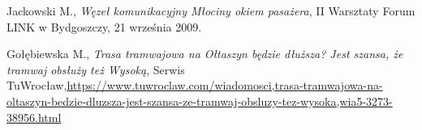 \begin{thebibliography}{99}
	Jackowski M., \emph{Węzeł komunikacyjny Młociny okiem pasażera}, II Warsztaty Forum LINK w Bydgoszczy, 21 września 2009.
	
	
	
	Gołębiewska M., \emph{Trasa tramwajowa na Ołtaszyn będzie dłuższa? Jest szansa, że tramwaj obsłuży też Wysoką}, Serwis TuWrocław,\url{https://www.tuwroclaw.com/wiadomosci,trasa-tramwajowa-na-oltaszyn-bedzie-dluzsza-jest-szansa-ze-tramwaj-obsluzy-tez-wysoka,wia5-3273-38956.html}
	
	
\end{thebibliography}
	